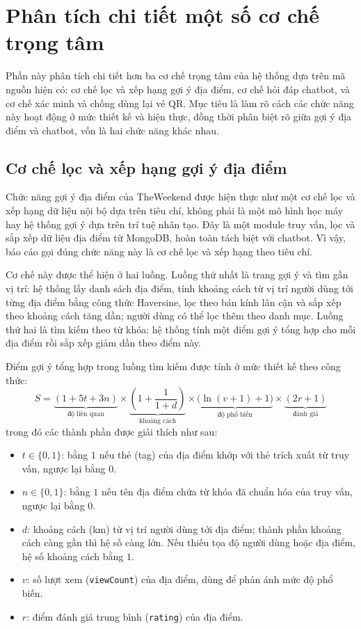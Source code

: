 ﻿\documentclass[../DoAn.tex]{subfiles}
\begin{document}
\section{Phân tích chi tiết một số cơ chế trọng tâm}

Phần này phân tích chi tiết hơn ba cơ chế trọng tâm của hệ thống dựa trên mã nguồn hiện có: cơ chế lọc và xếp hạng gợi ý địa điểm, cơ chế hỏi đáp chatbot, và cơ chế xác minh và chống dùng lại vé QR. Mục tiêu là làm rõ cách các chức năng này hoạt động ở mức thiết kế và hiện thực, đồng thời phân biệt rõ giữa gợi ý địa điểm và chatbot, vốn là hai chức năng khác nhau.

\subsection{Cơ chế lọc và xếp hạng gợi ý địa điểm}
\label{sec:recommendation}

Chức năng gợi ý địa điểm của TheWeekend được hiện thực như một cơ chế lọc và xếp hạng dữ liệu nội bộ dựa trên tiêu chí, không phải là một mô hình học máy hay hệ thống gợi ý dựa trên trí tuệ nhân tạo. Đây là một module truy vấn, lọc và sắp xếp dữ liệu địa điểm từ MongoDB, hoàn toàn tách biệt với chatbot. Vì vậy, báo cáo gọi đúng chức năng này là cơ chế lọc và xếp hạng theo tiêu chí.

Cơ chế này được thể hiện ở hai luồng. Luồng thứ nhất là trang gợi ý và tìm gần vị trí: hệ thống lấy danh sách địa điểm, tính khoảng cách từ vị trí người dùng tới từng địa điểm bằng công thức Haversine, lọc theo bán kính lân cận và sắp xếp theo khoảng cách tăng dần; người dùng có thể lọc thêm theo danh mục. Luồng thứ hai là tìm kiếm theo từ khóa: hệ thống tính một điểm gợi ý tổng hợp cho mỗi địa điểm rồi sắp xếp giảm dần theo điểm này.

Điểm gợi ý tổng hợp trong luồng tìm kiếm được tính ở mức thiết kế theo công thức:
\begin{equation}
S = \underbrace{(1 + 5t + 3n)}_{\text{độ liên quan}} \times \underbrace{\left(1 + \dfrac{1}{1 + d}\right)}_{\text{khoảng cách}} \times \underbrace{\big(\ln(v + 1) + 1\big)}_{\text{độ phổ biến}} \times \underbrace{(2r + 1)}_{\text{đánh giá}}
\label{eq:recommendation-score}
\end{equation}
trong đó các thành phần được giải thích như sau:
\begin{itemize}[leftmargin=1.6cm]
\item $t \in \{0, 1\}$: bằng $1$ nếu thẻ (tag) của địa điểm khớp với thẻ trích xuất từ truy vấn, ngược lại bằng $0$.
\item $n \in \{0, 1\}$: bằng $1$ nếu tên địa điểm chứa từ khóa đã chuẩn hóa của truy vấn, ngược lại bằng $0$.
\item $d$: khoảng cách (km) từ vị trí người dùng tới địa điểm; thành phần khoảng cách càng gần thì hệ số càng lớn. Nếu thiếu tọa độ người dùng hoặc địa điểm, hệ số khoảng cách bằng $1$.
\item $v$: số lượt xem (\texttt{viewCount}) của địa điểm, dùng để phản ánh mức độ phổ biến.
\item $r$: điểm đánh giá trung bình (\texttt{rating}) của địa điểm.
\end{itemize}
\end{document}
